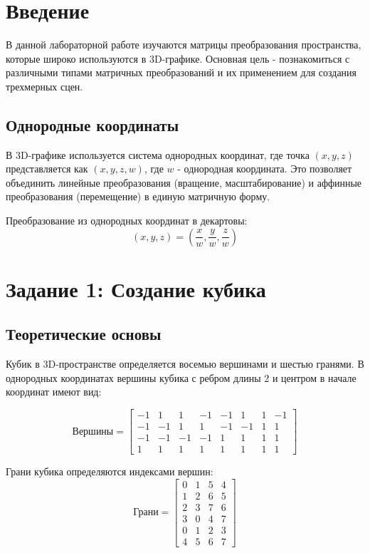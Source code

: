 \section*{Введение}

В данной лабораторной работе изучаются матрицы преобразования пространства, которые широко используются в 3D-графике. Основная цель - познакомиться с различными типами матричных преобразований и их применением для создания трехмерных сцен.

\subsection*{Однородные координаты}

В 3D-графике используется система однородных координат, где точка $(x, y, z)$ представляется как $(x, y, z, w)$, где $w$ - однородная координата. Это позволяет объединить линейные преобразования (вращение, масштабирование) и аффинные преобразования (перемещение) в единую матричную форму.

Преобразование из однородных координат в декартовы:
\begin{equation}
(x, y, z) = \left(\frac{x}{w}, \frac{y}{w}, \frac{z}{w}\right)
\end{equation}

\section*{Задание 1: Создание кубика}

\subsection*{Теоретические основы}

Кубик в 3D-пространстве определяется восемью вершинами и шестью гранями. В однородных координатах вершины кубика с ребром длины 2 и центром в начале координат имеют вид:

\begin{equation}
\text{Вершины} = \begin{bmatrix}
-1 & 1 & 1 & -1 & -1 & 1 & 1 & -1 \\
-1 & -1 & 1 & 1 & -1 & -1 & 1 & 1 \\
-1 & -1 & -1 & -1 & 1 & 1 & 1 & 1 \\
1 & 1 & 1 & 1 & 1 & 1 & 1 & 1
\end{bmatrix}
\end{equation}

Грани кубика определяются индексами вершин:
\begin{equation}
\text{Грани} = \begin{bmatrix}
0 & 1 & 5 & 4 \\  %
1 & 2 & 6 & 5 \\  %
2 & 3 & 7 & 6 \\  %
3 & 0 & 4 & 7 \\  %
0 & 1 & 2 & 3 \\  %
4 & 5 & 6 & 7     %
\end{bmatrix}
\end{equation}

